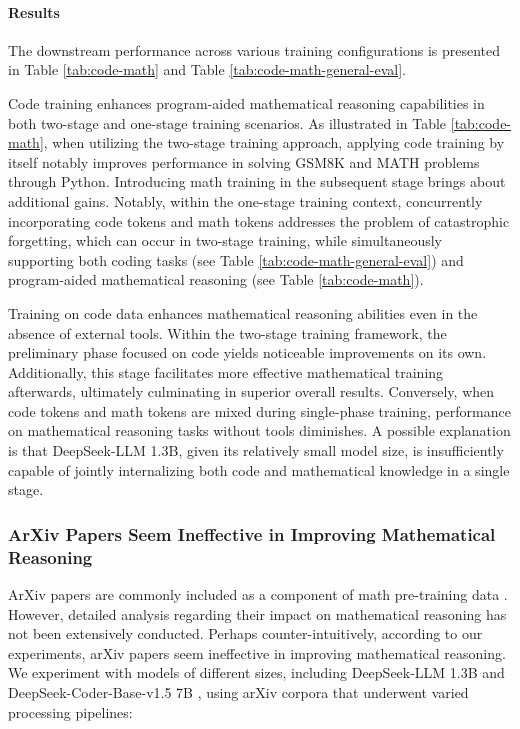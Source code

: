 \begin{itemize}[topsep=0pt]
\begin{itemize}[topsep=0pt]
\paragraph{Results}
The downstream performance across various training configurations is presented in Table \ref{tab:code-math} and Table \ref{tab:code-math-general-eval}.

Code training enhances program-aided mathematical reasoning capabilities in both two-stage and one-stage training scenarios. As illustrated in Table \ref{tab:code-math}, when utilizing the two-stage training approach, applying code training by itself notably improves performance in solving GSM8K and MATH problems through Python. Introducing math training in the subsequent stage brings about additional gains. Notably, within the one-stage training context, concurrently incorporating code tokens and math tokens addresses the problem of catastrophic forgetting, which can occur in two-stage training, while simultaneously supporting both coding tasks (see Table \ref{tab:code-math-general-eval}) and program-aided mathematical reasoning (see Table \ref{tab:code-math}).

Training on code data enhances mathematical reasoning abilities even in the absence of external tools. Within the two-stage training framework, the preliminary phase focused on code yields noticeable improvements on its own. Additionally, this stage facilitates more effective mathematical training afterwards, ultimately culminating in superior overall results. Conversely, when code tokens and math tokens are mixed during single-phase training, performance on mathematical reasoning tasks without tools diminishes. A possible explanation is that DeepSeek-LLM 1.3B, given its relatively small model size, is insufficiently capable of jointly internalizing both code and mathematical knowledge in a single stage.

\subsubsection{ArXiv Papers Seem Ineffective in Improving Mathematical Reasoning}

ArXiv papers are commonly included as a component of math pre-training data \citep{minerva,gpt-f,llemma,mathpile}. However, detailed analysis regarding their impact on mathematical reasoning has not been extensively conducted. Perhaps counter-intuitively, according to our experiments, arXiv papers seem ineffective in improving mathematical reasoning. We experiment with models of different sizes, including DeepSeek-LLM 1.3B and DeepSeek-Coder-Base-v1.5 7B \citep{deepseek-coder}, using arXiv corpora that underwent varied processing pipelines:


\end{itemize}
\end{itemize}
